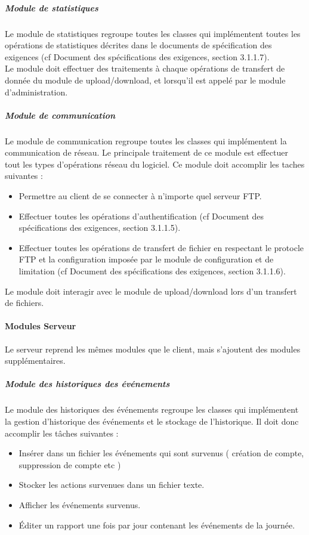 \documentclass[10pt,a4paper]{report}
\begin{document}
				\subparagraph{Module de statistiques}
				\begin{flushleft}
				Le module de statistiques regroupe toutes les classes qui implémentent toutes les opérations de statistiques décrites dans le documents de  spécification des exigences (cf Document des spécifications des exigences, section 3.1.1.7).\\
				Le module doit effectuer des traitements à chaque opérations de transfert de donnée du module de upload/download, et lorsqu'il est appelé par le module d'administration.
				\end{flushleft}
				
	
				\subparagraph{Module de communication}
				\begin{flushleft}
				Le module de communication regroupe toutes les classes qui implémentent la communication de réseau. Le principale traitement de ce module est effectuer tout les types d'opérations réseau du logiciel. Ce module doit accomplir les taches suivantes :
				\begin{itemize}
					\item Permettre au client de se connecter à n'importe quel serveur FTP.
					\item Effectuer toutes les opérations d'authentification (cf Document des spécifications des exigences, section 3.1.1.5).
					\item Effectuer toutes les opérations de transfert de fichier en respectant le protocle FTP et la configuration imposée par le module de configuration et de limitation (cf Document des spécifications des exigences, section 3.1.1.6).
				\end{itemize}
				
				Le module doit interagir avec le module de upload/download lors d'un transfert de fichiers.\\
				\end{flushleft}
				
				
			\paragraph{Modules Serveur}
				Le serveur reprend les mêmes modules que le client, mais s'ajoutent des modules supplémentaires. 
				
				\subparagraph{Module des historiques des événements}
				\begin{flushleft}
					Le module des historiques des événements regroupe les classes qui implémentent la gestion d'historique des événements et le stockage de l'historique. Il doit donc accomplir les tâches suivantes : 
					\begin{itemize}
						\item Insérer dans un fichier les événements qui sont survenus ( création de compte, suppression de compte etc )
						\item Stocker les actions survenues dans un fichier texte.
						\item Afficher les événements survenus.
						\item Éditer un rapport une fois par jour contenant les événements de la journée.
					\end{itemize}
				\end{flushleft}
				
\end{document}

